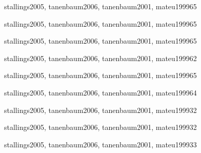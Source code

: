 \begin{syllabus}
\begin{unit}{\OSSchedulingAndDispatchDef}{stallings2005, tanenbaum2006, tanenbaum2001, mateu1999}{6}{5}
    \OSSchedulingAndDispatchAllTopics
    \OSSchedulingAndDispatchAllObjectives
\end{unit}

\begin{unit}{\OSMemoryManagementDef}{stallings2005, tanenbaum2006, tanenbaum2001, mateu1999}{6}{5}
    \OSMemoryManagementAllTopics
    \OSMemoryManagementAllObjectives
\end{unit}

\begin{unit}{\OSDeviceManagementDef}{stallings2005, tanenbaum2006, tanenbaum2001, mateu1999}{6}{5}
    \OSDeviceManagementAllTopics
    \OSDeviceManagementAllObjectives
\end{unit}

\begin{unit}{\OSSecurityAndProtectionDef}{stallings2005, tanenbaum2006, tanenbaum2001, mateu1999}{6}{2}
    \OSSecurityAndProtectionAllTopics
    \OSSecurityAndProtectionAllObjectives
\end{unit}

\begin{unit}{\OSFileSystemsDef}{stallings2005, tanenbaum2006, tanenbaum2001, mateu1999}{6}{5}
    \OSFileSystemsAllTopics
    \OSFileSystemsAllObjectives
\end{unit}

\begin{unit}{\OSRealTimeAndEmbeddedSystemsDef}{stallings2005, tanenbaum2006, tanenbaum2001, mateu1999}{6}{4}
    \OSRealTimeAndEmbeddedSystemsAllTopics
    \OSRealTimeAndEmbeddedSystemsAllObjectives
\end{unit}

\begin{unit}{\OSFaultToleranceDef}{stallings2005, tanenbaum2006, tanenbaum2001, mateu1999}{3}{2}
    \OSFaultToleranceAllTopics
    \OSFaultToleranceAllObjectives
\end{unit}

\begin{unit}{\OSSystemPerformanceEvaluationDef}{stallings2005, tanenbaum2006, tanenbaum2001, mateu1999}{3}{2}
      \OSSystemPerformanceEvaluationAllTopics
      \OSSystemPerformanceEvaluationAllObjectives
  \end{unit}

\begin{unit}{\OSScriptingDef}{stallings2005, tanenbaum2006, tanenbaum2001, mateu1999}{3}{3}
      \OSScriptingAllTopics
      \OSScriptingAllObjectives
\end{unit}



\begin{coursebibliography}
\end{coursebibliography}

\end{syllabus}
